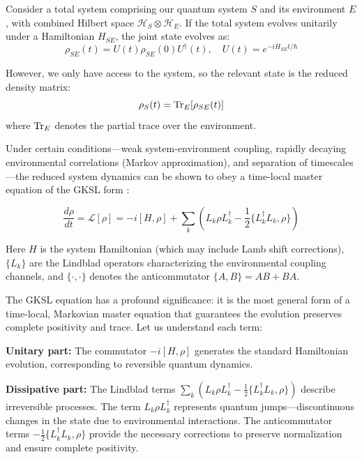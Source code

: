 \documentclass[12pt,a4paper]{article}
\newcommand{\cH}{\mathcal{H}}
\begin{document}
Consider a total system comprising our quantum system $S$ and its environment $E$, with combined Hilbert space $\cH_S \otimes \cH_E$. If the total system evolves unitarily under a Hamiltonian $H_{SE}$, the joint state evolves as:
\begin{equation}
\rho_{SE}(t) = U(t) \rho_{SE}(0) U^\dagger(t), \quad U(t) = e^{-iH_{SE}t/\hbar}
\end{equation}

However, we only have access to the system, so the relevant state is the reduced density matrix:
\begin{equation}
\rho_S(t) = \Tr_E[\rho_{SE}(t)]
\end{equation}
where $\Tr_E$ denotes the partial trace over the environment.

Under certain conditions—weak system-environment coupling, rapidly decaying environmental correlations (Markov approximation), and separation of timescales—the reduced system dynamics can be shown to obey a time-local master equation of the GKSL form \cite{gorini1976,lindblad1976}:

\begin{equation}
\frac{d\rho}{dt} = \mathcal{L}[\rho] = -i[H, \rho] + \sum_{k} \left(L_k \rho L_k^\dagger - \frac{1}{2}\{L_k^\dagger L_k, \rho\}\right)
\end{equation}

Here $H$ is the system Hamiltonian (which may include Lamb shift corrections), $\{L_k\}$ are the Lindblad operators characterizing the environmental coupling channels, and $\{\cdot, \cdot\}$ denotes the anticommutator $\{A,B\} = AB + BA$.

The GKSL equation has a profound significance: it is the most general form of a time-local, Markovian master equation that guarantees the evolution preserves complete positivity and trace. Let us understand each term:

\textbf{Unitary part:} The commutator $-i[H,\rho]$ generates the standard Hamiltonian evolution, corresponding to reversible quantum dynamics.

\textbf{Dissipative part:} The Lindblad terms $\sum_k (L_k \rho L_k^\dagger - \frac{1}{2}\{L_k^\dagger L_k, \rho\})$ describe irreversible processes. The term $L_k \rho L_k^\dagger$ represents quantum jumps—discontinuous changes in the state due to environmental interactions. The anticommutator terms $-\frac{1}{2}\{L_k^\dagger L_k, \rho\}$ provide the necessary corrections to preserve normalization and ensure complete positivity.
\end{document}
